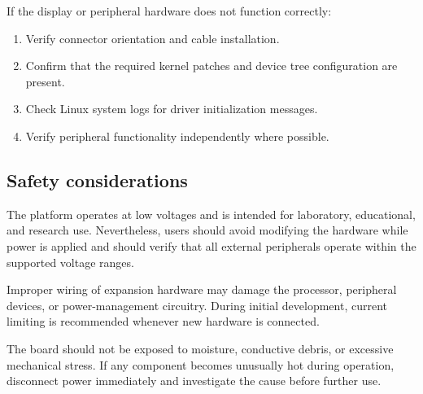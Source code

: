 If the display or peripheral hardware does not function correctly:

\begin{enumerate}
\item Verify connector orientation and cable installation.
\item Confirm that the required kernel patches and device tree configuration 
are present.
\item Check Linux system logs for driver initialization messages.
\item Verify peripheral functionality independently where possible.
\end{enumerate}

\subsection{Safety considerations}

The platform operates at low voltages and is intended for laboratory, 
educational, and research use. Nevertheless, users should avoid modifying 
the hardware while power is applied and should verify that all external 
peripherals operate within the supported voltage ranges.

Improper wiring of expansion hardware may damage the processor, peripheral 
devices, or power-management circuitry. During initial development, current 
limiting is recommended whenever new hardware is connected.

The board should not be exposed to moisture, conductive debris, or excessive 
mechanical stress. If any component becomes unusually hot during operation, 
disconnect power immediately and investigate the cause before further use.
